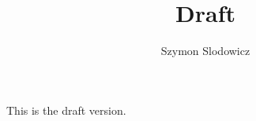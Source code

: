 \documentclass[10pt,a4paper]{article}
\title{Draft}
\author{Szymon Slodowicz}
\begin{document}
	This is the draft version.
\end{document}
